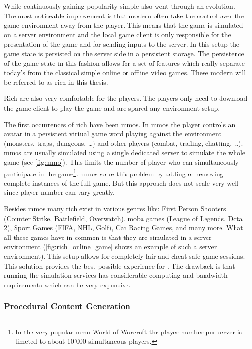 While continuously gaining popularity simple \ogs{} also went through an
evolution. The most noticeable improvement is that modern \ogs{} often take the
control over the game environment away from the player. This means that the game
is simulated on a server environment and the local game client is only
responsible for the presentation of the game and for sending inputs to the
server. In this setup the game state is persisted on the server side in a
persistent storage. The persistence of the game state in this fashion allows for
a set of features which really separate today's \ogs{} from the classical simple
online or offline video games. These modern \ogs{} will be referred to as rich
\og{} in this thesis.

Rich \ogs{} are also very comfortable for the players. The players only need to
download the game client to play the game and are spared any environment setup.

The first occurrences of rich \og{} have been \glspl{mmo}. In \glspl{mmo} the
player controls an avatar in a persistent virtual game word playing against the
environment (monsters, traps, dungeons, \ldots) and other players (combat,
trading, chatting, \ldots). \glspl{mmo} are usually simulated using a single
dedicated server to simulate the whole game (see \autoref{fig:mmo}). This limits the
number of player who can simultaneously participate in the game\footnote{In the
very popular \gls{mmo} World of Warcraft the player number per server is
limeted to about 10'000 simultaneous players.}. \glspl{mmo} solve this problem
by adding or removing complete instances of the full game. But this approach
does not scale very well since player number can vary greatly.

Besides \glspl{mmo} many rich \ogs{} exist in various genres like: First Person
Shooters (Counter Strike, Battlefield, Overwatch), \gls{moba} games (League of
Legends, Dota 2), Sport Games (FIFA, NHL, Golf), Car Racing Games, and many
more. What all these games have in common is that they are simulated in a server
environment (\autoref{fig:rich_online_game} shows an example of such a server
environment). This setup allows for completely fair and cheat safe game
sessions. This solution provides the best possible experience for \ogs{}. The
drawback is that running the simulation services has considerable computing and
bandwidth requirements which can be very expensive.

\subsubsection{Procedural Content Generation}

